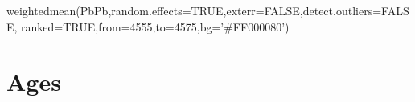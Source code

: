 \begin{refsection}
\begin{script}
weightedmean(PbPb,random.effects=TRUE,exterr=FALSE,detect.outliers=FALSE,
             ranked=TRUE,from=4555,to=4575,bg='#FF000080')
\end{script}

\section{Ages}\label{sec:PbPbAges}

\printbibliography[heading=subbibliography]

\end{refsection}
